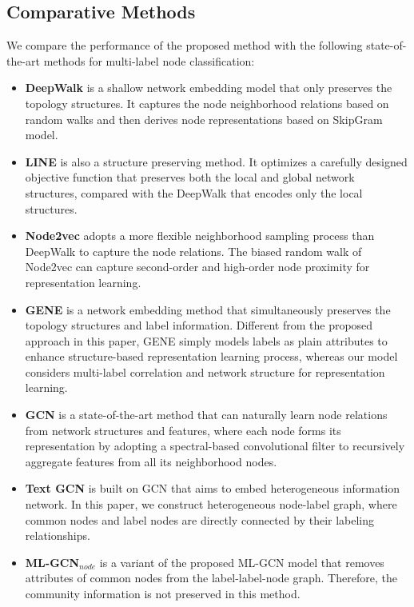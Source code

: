 \documentclass[conference]{IEEEtran}
\begin{document}
\subsection{Comparative Methods}
We compare the performance of the proposed method with the following state-of-the-art methods for multi-label node classification:
\begin{itemize}
    \item \textbf{DeepWalk} \cite{21} is a shallow network embedding model that only preserves the topology structures. It captures the node neighborhood relations based on random walks and then derives node representations based on SkipGram model.
    \item \textbf{LINE} \cite{23} is also a structure preserving method. It optimizes a carefully designed objective function
    that preserves both the local and global network structures, compared with the DeepWalk that encodes only the local structures.
    \item \textbf{Node2vec} \cite{26} adopts a more flexible neighborhood sampling process than DeepWalk to capture the node relations. The biased random walk of Node2vec can capture second-order and high-order node proximity for representation learning.
    \item \textbf{GENE} \cite{12} is a network embedding method that simultaneously preserves the topology structures and label information. Different from the proposed approach in this paper, GENE simply models labels as plain attributes to enhance structure-based representation learning process, whereas our model considers multi-label correlation and network structure for representation learning. 
    \item \textbf{GCN} \cite{14} is a state-of-the-art method that can naturally learn node relations from network structures and features, where each node forms its representation by adopting a spectral-based convolutional filter to recursively aggregate features from all its neighborhood nodes.
    \item \textbf{Text GCN} \cite{25} is built on GCN that aims to embed heterogeneous information network. In this paper, we construct  heterogeneous node-label graph, where common nodes and label nodes are directly connected by their labeling relationships.
    \item \textbf{ML-GCN$_{node}$} is a variant of the proposed ML-GCN model that removes attributes of common nodes from the label-label-node graph. Therefore, the community information is not preserved in this method.


\end{itemize}
\end{document}
